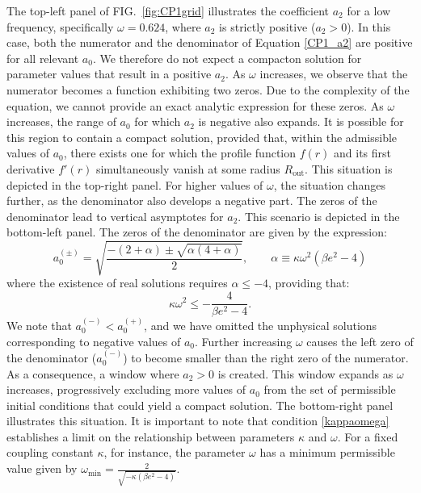 \documentclass[aps,prd,superscriptaddress,notitlepage,11pt,final,longbibliography,nofootinbib]{revtex4-1}
\numberwithin{equation}{section}
\begin{document}
The top-left panel of FIG.~\ref{fig:CP1grid} illustrates the coefficient $a_2$ for a low frequency, specifically $\omega=0.624$, where $a_2$ is strictly positive ($a_2>0$). In this case, both the numerator and the denominator of Equation \eqref{CP1_a2} are positive for all relevant $a_0$. We therefore do not expect a compacton solution for parameter values that result in a positive $a_2$. As $\omega$ increases, we observe that the numerator becomes a function exhibiting two zeros. Due to the complexity of the equation, we cannot provide an exact analytic expression for these zeros. As $\omega$ increases, the range of $a_0$ for which $a_2$ is negative also expands. It is possible for this region to contain a compact solution, provided that, within the admissible values of $a_0$, there exists one for which the profile function $f(r)$ and its first derivative $f'(r)$ simultaneously vanish at some radius $R_{\text{out}}$. This situation is depicted in the top-right panel. For higher values of $\omega$, the situation changes further, as the denominator also develops a negative part. The zeros of the denominator lead to vertical asymptotes for $a_2$. This scenario is depicted in the bottom-left panel. The zeros of the denominator are given by the expression:
\begin{equation}
a_0^{(\pm)}=\sqrt{\frac{-(2+\alpha)\pm\sqrt{\alpha(4+\alpha)}}{2}},\qquad \alpha\equiv \kappa \omega^2(\beta e^2-4)\label{asymptota}
\end{equation}
where the existence of real solutions requires $\alpha\le -4$, providing that:
\begin{equation}
\kappa \omega^2\le -\frac{4}{\beta e^2-4}.\label{kappaomega}
\end{equation}
We note that $a_0^{(-)}<a_0^{(+)}$, and we have omitted the unphysical solutions corresponding to negative values of $a_0$. Further increasing $\omega$ causes the left zero of the denominator ($a_0^{(-)}$) to become smaller than the right zero of the numerator. As a consequence, a window where $a_2>0$ is created. This window expands as $\omega$ increases, progressively excluding more values of $a_0$ from the set of permissible initial conditions that could yield a compact solution. The bottom-right panel illustrates this situation. It is important to note that condition \eqref{kappaomega} establishes a limit on the relationship between parameters $\kappa$ and $\omega$. For a fixed coupling constant $\kappa$, for instance, the parameter $\omega$ has a minimum permissible value given by $\omega_{\min}=\frac{2}{\sqrt{-\kappa(\beta e^2-4)}}$.
\end{document}

